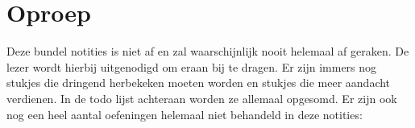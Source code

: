 \documentclass[main.tex]{subfiles}
\begin{document}
\chapter{Oproep}
\label{cha:oproep}

Deze bundel notities is niet af en zal waarschijnlijk nooit helemaal af geraken.
De lezer wordt hierbij uitgenodigd om eraan bij te dragen.
Er zijn immers nog {\Huge\hspace{5px}\hspace{5px}} stukjes die dringend herbekeken moeten worden en {\Huge\hspace{5px}\hspace{5px}} stukjes die meer aandacht verdienen.
In de todo lijst achteraan worden ze allemaal opgesomd.
\newline
Er zijn ook nog een heel aantal oefeningen helemaal niet behandeld in deze notities:\\
\end{document}
